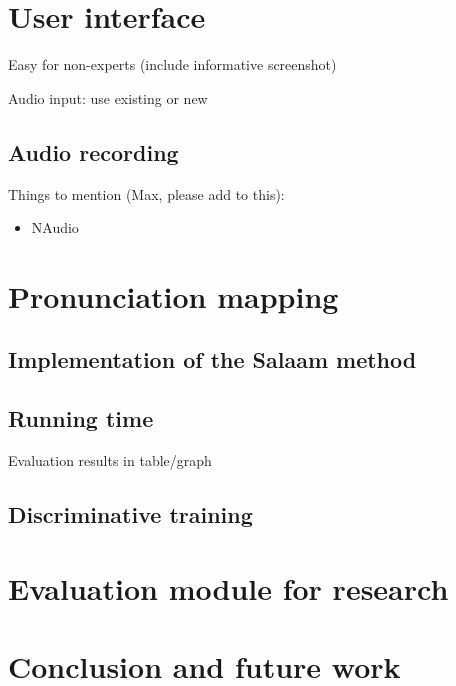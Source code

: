 \documentclass[11pt]{article}
\begin{document}
\section{User interface}
\label{sec:frontend}
Easy for non-experts (include informative screenshot)

Audio input: use existing or new

\subsection{Audio recording}
\label{sec:recording}

Things to mention (Max, please add to this):
\begin{itemize}
\item{NAudio}
\end{itemize}



\section{Pronunciation mapping}
\label{sec:backend}

\subsection{Implementation of the Salaam method}
\label{sec:implementation}
\cite{Qiao10}

\subsection{Running time}
\label{sec:runningtime}
Evaluation results in table/graph

\subsection{Discriminative training}
\label{sec:discrimtrain}
\cite{Chan12}


\section{Evaluation module for research}
\label{sec:evaluation}

\section{Conclusion and future work}
\label{sec:future}




%

%
%


\end{document}

